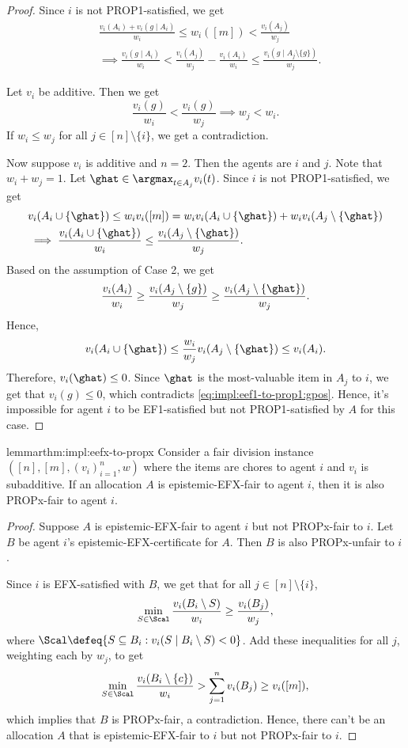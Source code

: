 \begin{proof}
Since $i$ is not PROP1-satisfied, we get
\begin{align*}
& \frac{v_i(A_i) + v_i(g \mid A_i)}{w_i} \le w_i([m]) < \frac{v_i(A_j)}{w_j}
\\ &\implies \frac{v_i(g \mid A_i)}{w_i} < \frac{v_i(A_j)}{w_j} - \frac{v_i(A_i)}{w_i}
    \le \frac{v_i(g \mid A_j \setminus \{g\})}{w_j}.
\end{align*}

Let $v_i$ be additive. Then we get
\[ \frac{v_i(g)}{w_i} < \frac{v_i(g)}{w_j} \implies w_j < w_i. \]
If $w_i \le w_j$ for all $j \in [n] \setminus \{i\}$, we get a contradiction.

Now suppose $v_i$ is additive and $n=2$.
Then the agents are $i$ and $j$. Note that $w_i + w_j = 1$.
Let $\ghat \in \argmax_{t \in A_j} v_i(t)$.
Since $i$ is not PROP1-satisfied, we get
\begin{align*}
& v_i(A_i \cup \{\ghat\}) \le w_iv_i([m]) = w_iv_i(A_i \cup \{\ghat\}) + w_iv_i(A_j \setminus \{\ghat\})
\\ &\implies \frac{v_i(A_i \cup \{\ghat\})}{w_i} \le \frac{v_i(A_j \setminus \{\ghat\})}{w_j}.
\end{align*}
Based on the assumption of Case 2, we get
\[ \frac{v_i(A_i)}{w_i} \ge \frac{v_i(A_j \setminus \{g\})}{w_j} \ge \frac{v_i(A_j \setminus \{\ghat\})}{w_j}. \]
Hence,
\[ v_i(A_i \cup \{\ghat\}) \le \frac{w_i}{w_j}v_i(A_j \setminus \{\ghat\}) \le v_i(A_i). \]
Therefore, $v_i(\ghat) \le 0$.
Since $\ghat$ is the most-valuable item in $A_j$ to $i$, we get that $v_i(g) \le 0$,
which contradicts \eqref{eq:impl:eef1-to-prop1:gpos}.
Hence, it's impossible for agent $i$ to be EF1-satisfied but not PROP1-satisfied by $A$ for this case.
\end{proof}

\begin{restatable}{lemma}{rthm:impl:eefx-to-propx}
\label{thm:impl:eefx-to-propx}
Consider a fair division instance $([n], [m], (v_i)_{i=1}^n, w)$ where
the items are chores to agent $i$ and $v_i$ is subadditive.
If an allocation $A$ is epistemic-EFX-fair to agent $i$,
then it is also PROPx-fair to agent $i$.
\end{restatable}
\begin{proof}
Suppose $A$ is epistemic-EFX-fair to agent $i$ but not PROPx-fair to $i$.
Let $B$ be agent $i$'s epistemic-EFX-certificate for $A$.
Then $B$ is also PROPx-unfair to $i$.

Since $i$ is EFX-satisfied with $B$, we get that for all $j \in [n] \setminus \{i\}$,
\[ \min_{S \in \Scal} \frac{v_i(B_i \setminus S)}{w_i} \ge \frac{v_i(B_j)}{w_j}, \]
where $\Scal \defeq \{S \subseteq B_i: v_i(S \mid B_i \setminus S) < 0\}$.
Add these inequalities for all $j$, weighting each by $w_j$, to get
\[ \min_{S \in \Scal} \frac{v_i(B_i \setminus \{c\})}{w_i} > \sum_{j=1}^n v_i(B_j) \ge v_i([m]), \]
which implies that $B$ is PROPx-fair, a contradiction.
Hence, there can't be an allocation $A$ that is epistemic-EFX-fair to $i$
but not PROPx-fair to $i$.
\end{proof}

